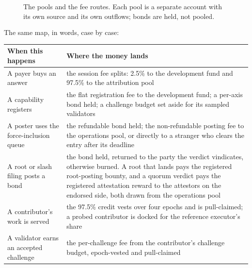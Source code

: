 \documentclass[11pt]{article}
\begin{document}
\begin{figure}[t]
{%
    }
    \caption{The pools and the fee routes. Each pool is a separate
        account with its own source and its own outflows; bonds are
        held, not pooled.}
    \label{fig:pools}
\end{figure}

The same map, in words, case by case:

\begin{center}
    \begin{tabular}{@{}p{6.0cm}p{9.5cm}@{}}
        \toprule
        \textbf{When this happens}              & \textbf{Where the money lands}       \\
        \midrule
        A payer buys an answer                  & the session fee splits: 2.5\% to the
        development fund and 97.5\% to the attribution pool                            \\
        A capability registers                  & the flat registration fee to the
        development fund; a per-axis bond held; a challenge budget set
        aside for its sampled validators                                               \\
        A poster uses the force-inclusion queue & the refundable bond
        held; the non-refundable posting fee to the operations pool, or
        directly to a stranger who clears the entry after its deadline                 \\
        A root or slash filing posts a bond     & the bond held, returned to
        the party the verdict vindicates, otherwise burned. A root that
        lands pays the registered root-posting bounty, and a quorum
        verdict pays the registered attestation reward to the attestors
        on the endorsed side, both drawn from the operations pool                      \\
        A contributor's work is served          & the 97.5\% credit vests over
        four epochs and is pull-claimed; a probed contributor is docked
        for the reference executor's share                                             \\
        A validator earns an accepted challenge & the per-challenge fee
        from the contributor's challenge budget, epoch-vested and
        pull-claimed                                                                   \\
        \bottomrule
    \end{tabular}
\end{center}
\end{document}
